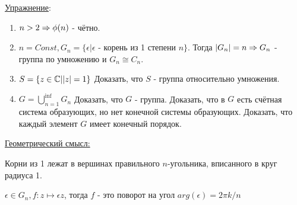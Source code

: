 \underline{Упражнение}:
\begin{enumerate}
\item $n > 2 \Rightarrow \phi(n)$ - чётно.
\item $n = Const, G_n = \{\epsilon | \epsilon$ - корень из 1 степени $n\}$. Тогда $|G_n| = n \Rightarrow G_n$ - группа по умножению и $G_n \cong C_n$.
\item $S = \{z \in \mathbb{C} | |z| = 1\}$ Доказать, что $S$ - группа относительно умножения.
\item $G = \bigcup\limits_{n = 1}^{\inf} G_n$ Доказать, что $G$ - группа. Доказать, что в $G$ есть счётная система образующих, но нет конечной системы образующих. Доказать, что каждый элемент $G$ имеет конечный порядок. 
\end{enumerate}

\underline{Геометрический смысл:}
\begin{center}
\def\svgwidth{6.0cm}

\end{center}
Корни из 1 лежат в вершинах правильного $n$-угольника, вписанного в круг радиуса 1.

$\epsilon \in G_n, f: z \mapsto \epsilon z$, тогда $f$ - это поворот на угол $arg(\epsilon) = {2 \pi k}/n$